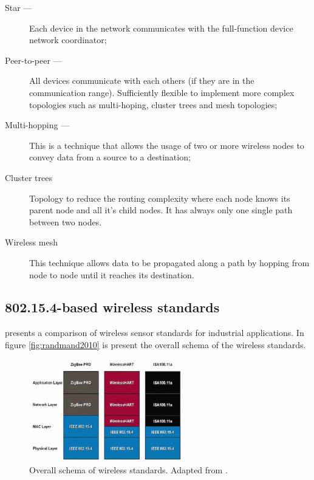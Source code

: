 \begin{description}
	\item[Star ---] Each device in the network communicates with the full-function device network coordinator;
	
	\item[Peer-to-peer ---] All devices communicate with each others (if they are in the communication range). Sufficiently flexible to implement more complex topologies such as multi-hoping, cluster trees and mesh topologies;
	
	\item[Multi-hopping ---] This is a technique that allows the usage of two or more wireless nodes to convey data from a source to a destination;
	
	\item[Cluster trees] Topology to reduce the routing complexity where each node knows its parent node and all it's child nodes. It has always only one single path between two nodes.
	
	\item[Wireless mesh] This technique allows data to be propagated along a path by hopping from node to node until it reaches its destination.
		
\end{description}

\subsection{802.15.4-based wireless standards}

\cite{Radmand2010} presents a comparison of wireless sensor standards for industrial applications. In figure \ref{fig:randmand2010} is present the overall schema of the wireless standards.


\begin{figure}[h!]
	\centering
	\includegraphics[width=0.6\textwidth,keepaspectratio]{figures/radmand2010}
	\caption{Overall schema of wireless standards. Adapted from \cite{Radmand2010}.}
	\label{fig:radmand2010}
\end{figure}



